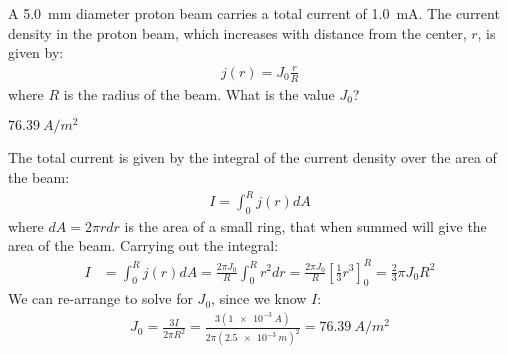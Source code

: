 \question A \SI{5.0}{mm} diameter proton beam carries a total current of \SI{1.0}{mA}. The current density in the proton beam, which increases with distance from the center, $r$, is given by:
\begin{align*}
j(r)=J_0\frac{r}{R}
\end{align*}
where $R$ is the radius of the beam. What is the value $J_0$?
\begin{finalanswer}
$\SI{76.39}{A/m^2}$
\end{finalanswer}
\begin{solution}
The total current is given by the integral of the current density over the area of the beam:
\begin{align*}
I=\int_0^R j(r)dA
\end{align*}
where $dA=2\pi r dr$ is the area of a small ring, that when summed will give the area of the beam. Carrying out the integral:
\begin{align*}
I&=\int_0^R j(r)dA=\frac{2\pi J_0}{R}\int_0^R r^2 dr=\frac{2\pi J_0}{R}\left[ \frac{1}{3}r^3\right]_0^R=\frac{2}{3}\pi J_0R^2
\end{align*}
We can re-arrange to solve for $J_0$, since we know $I$:
\begin{align*}
J_0=\frac{3I}{2\pi R^2}=\frac{3(\SI{1e-3}{A})}{2\pi(\SI{2.5e-3}{m})^2}=\SI{76.39}{A/m^2}
\end{align*}
\end{solution}

